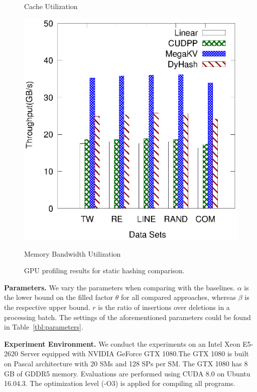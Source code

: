 \begin{figure}[t]
\begin{minipage}{0.3\linewidth}
		\centerline{Cache Utilization}
	\end{minipage}
	\hfill
	\begin{minipage}{0.3\linewidth}\centering
		\includegraphics[width=\linewidth]{pic/static-profi/memory-read.eps}
		\centerline{Memory Bandwidth Utilization}
	\end{minipage}
	\caption{GPU profiling results for static hashing comparison.}
	\label{fig:static:profile}
\end{figure}

\vspace{1mm}\noindent\textbf{Parameters.}
We vary the parameters when comparing \voter with the baselines.
$\alpha$ is the lower bound on the filled factor $\theta$ for all compared approaches,
whereas $\beta$ is the respective upper bound.
$r$ is the ratio of insertions over deletions in a processing batch. 
The settings of the aforementioned parameters could be found in Table~\ref{tbl:parameters}.

\vspace{1mm}\noindent\textbf{Experiment Environment.}
We conduct the experiments on an Intel Xeon E5-2620 Server equipped with NVIDIA GeForce GTX 1080.The GTX 1080 is built on Pascal architecture with 20 SMs and 128 SPs per SM. The GTX 1080 has 8 GB of GDDR5 memory. Evaluations are performed using CUDA 8.0 on Ubuntu 16.04.3. The optimization level (-O3) is applied for compiling all programs.



